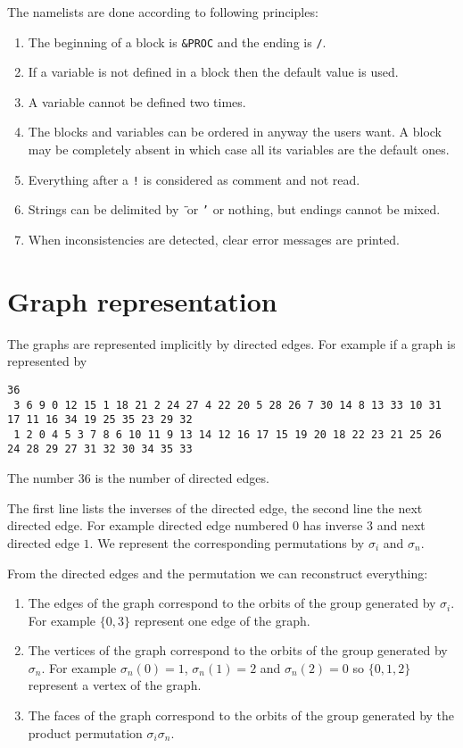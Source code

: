 \documentclass[12pt]{amsart}
\begin{document}
The namelists are done according to following principles:
\begin{enumerate}
\item The beginning of a block is {\tt \&PROC} and the ending is {\tt /}.
\item If a variable is not defined in a block then the default value is used.
\item A variable cannot be defined two times.
\item The blocks and variables can be ordered in anyway the users want. A block may be completely absent in which case all its variables are the default ones.
\item Everything after a {\tt !} is considered as comment and not read.
\item Strings can be delimited by {\tt {\"{ }}} or {\tt '} or nothing, but endings cannot be mixed.
\item When inconsistencies are detected, clear error messages are printed.
\end{enumerate}


\section{Graph representation}

The graphs are represented implicitly by directed edges.
For example if a graph is represented by
\begin{verbatim}
36
 3 6 9 0 12 15 1 18 21 2 24 27 4 22 20 5 28 26 7 30 14 8 13 33 10 31 17 11 16 34 19 25 35 23 29 32
 1 2 0 4 5 3 7 8 6 10 11 9 13 14 12 16 17 15 19 20 18 22 23 21 25 26 24 28 29 27 31 32 30 34 35 33
\end{verbatim}
The number $36$ is the number of directed edges.

The first line lists the inverses of the directed edge, the second line the next directed edge.
For example directed edge numbered $0$ has inverse $3$ and next directed edge $1$. We represent
the corresponding permutations by $\sigma_i$ and $\sigma_n$.

From the directed edges and the permutation we can reconstruct everything:
\begin{enumerate}
\item The edges of the graph correspond to the orbits of the group generated by $\sigma_i$.
  For example $\{0,3\}$ represent one edge of the graph.
\item The vertices of the graph correspond to the orbits of the group generated by $\sigma_n$.
  For example $\sigma_n(0)=1$, $\sigma_n(1)=2$ and $\sigma_n(2)=0$ so $\{0,1,2\}$ represent a vertex
  of the graph.
\item The faces of the graph correspond to the orbits of the group generated by the product permutation $\sigma_i\sigma_n$.
\end{enumerate}
\end{document}
